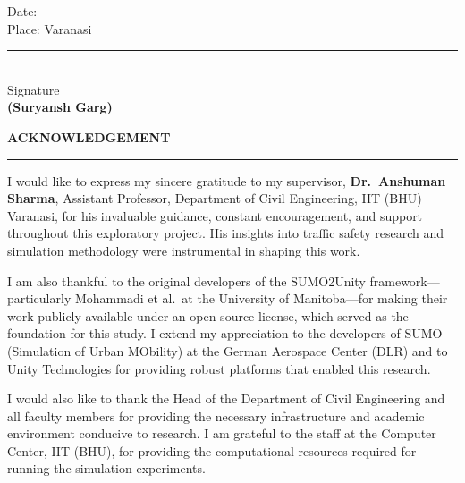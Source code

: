 \documentclass[12pt,a4paper,oneside]{report}
\begin{document}
\vspace{1.5cm}

\noindent Date: \textcolor{BorderColor}{\hrulefill} \\[0.5cm]
\noindent Place: Varanasi

\vspace{3cm}

\hfill
\begin{minipage}[t]{0.45\textwidth}
\centering
{\color{PrimaryNavy}\rule{5cm}{0.8pt}}\\[6pt]
Signature\\
\textbf{(Suryansh Garg)}
\end{minipage}

\newpage
\thispagestyle{empty}

\begin{center}
    {\color{PrimaryNavy}\fontsize{20}{24}\selectfont\bfseries ACKNOWLEDGEMENT}\\[4pt]
    {\color{AccentTeal}\rule{4cm}{2pt}}
\end{center}
\vspace{0.8cm}

I would like to express my sincere gratitude to my supervisor, \textbf{Dr.\ Anshuman Sharma}, Assistant Professor, Department of Civil Engineering, IIT (BHU) Varanasi, for his invaluable guidance, constant encouragement, and support throughout this exploratory project. His insights into traffic safety research and simulation methodology were instrumental in shaping this work.

I am also thankful to the original developers of the SUMO2Unity framework---particularly Mohammadi et al.\ at the University of Manitoba---for making their work publicly available under an open-source license, which served as the foundation for this study. I extend my appreciation to the developers of SUMO (Simulation of Urban MObility) at the German Aerospace Center (DLR) and to Unity Technologies for providing robust platforms that enabled this research.

I would also like to thank the Head of the Department of Civil Engineering and all faculty members for providing the necessary infrastructure and academic environment conducive to research. I am grateful to the staff at the Computer Center, IIT (BHU), for providing the computational resources required for running the simulation experiments.
\end{document}
